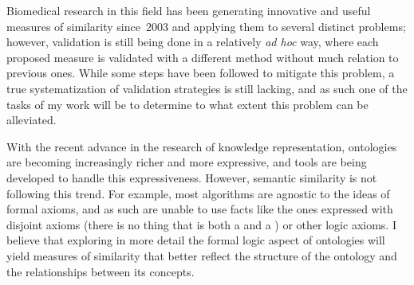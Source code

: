 Biomedical research in this field has been generating innovative and useful measures of similarity since~2003 and applying them to several distinct problems; however, validation is still being done in a relatively \emph{ad hoc} way, where each proposed measure is validated with a different method without much relation to previous ones. While some steps have been followed to mitigate this problem, a true systematization of validation strategies is still lacking, and as such one of the tasks of my work will be to determine to what extent this problem can be alleviated.

With the recent advance in the research of knowledge representation, ontologies are becoming increasingly richer and more expressive, and tools are being developed to handle this expressiveness. However, semantic similarity is not following this trend. For example, most algorithms are agnostic to the ideas of formal axioms, and as such are unable to use facts like the ones expressed with disjoint axioms (\ie there is no thing that is both a  and a ) or other logic axioms. I believe that exploring in more detail the formal logic aspect of ontologies will yield measures of similarity that better reflect the structure of the ontology and the relationships between its concepts.




